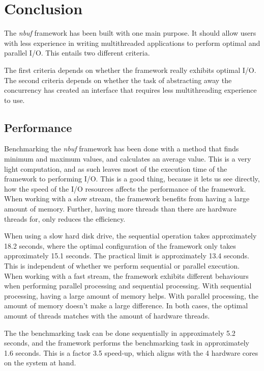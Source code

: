 \documentclass[a4paper]{article}
\newcommand{\nbuf}{\textit{nbuf} }
\begin{document}
\newpage
\section{Conclusion}
The \nbuf framework has been built with one main purpose. It should allow users with less experience in writing multithreaded applications to perform optimal and parallel I/O. This entails two different criteria. 

The first criteria depends on whether the framework really exhibits optimal I/O. The second criteria depends on whether the task of abstracting away the concurrency has created an interface that requires less multithreading experience to use.


\subsection{Performance}
Benchmarking the \nbuf framework has been done with a method that finds minimum and maximum values, and calculates an average value. This is a very light computation, and as such leaves most of the execution time of the framework to performing I/O. This is a good thing, because it lets us see directly, how the speed of the I/O resources affects the performance of the framework.\\

When working with a slow stream, the framework benefits from having a large amount of memory. Further, having more threads than there are hardware threads for, only reduces the efficiency. 

When using a slow hard disk drive, the sequential operation takes approximately 18.2 seconds, where the optimal configuration of the framework only takes approximately 15.1 seconds. The practical limit is approximately 13.4 seconds. This is independent of whether we perform sequential or parallel execution.\\

When working with a fast stream, the framework exhibits different behaviours when performing parallel processing and sequential processing. With sequential processing, having a large amount of memory helps. With parallel processing, the amount of memory doesn't make a large difference. In both cases, the optimal amount of threads matches with the amount of hardware threads. 

The the benchmarking task can be done sequentially in approximately 5.2 seconds, and the framework performs the benchmarking task in approximately 1.6 seconds. This is a factor 3.5 speed-up, which aligns with the 4 hardware cores on the system at hand.\\
\end{document}

